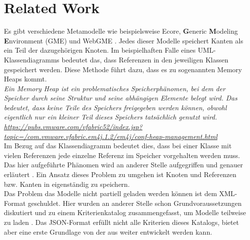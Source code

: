 \section{Related Work}
Es gibt verschiedene Metamodelle wie beispielsweise Ecore, \textbf{G}eneric \textbf{M}odeling \textbf{E}nvironment (GME) \cite{ledeczi2001generic} und WebGME \cite{maroti2014online}. Jedes dieser Modelle speichert Kanten als ein Teil der dazugehörigen Knoten. Im beispielhaften Falle eines UML-Klassendiagramms bedeutet das, dass Referenzen in den jeweiligen Klassen gespeichert werden. Diese Methode führt dazu, dass es zu sogenannten Memory Heaps kommt. \\
\textit{Ein Memory Heap ist ein problematisches Speicherphänomen, bei dem der Speicher durch seine Struktur und seine abhängigen Elemente belegt wird. Das bedeutet, dass keine Teile des Speichers freigegeben werden können, obwohl eigentlich nur ein kleiner Teil dieses Speichers tatsächlich genutzt wird. \url{https://pubs.vmware.com/vfabric52/index.jsp?topic=/com.vmware.vfabric.em4j.1.2/em4j/conf-heap-management.html}} \\
Im Bezug auf das Klassendiagramm bedeutet dies, dass bei einer Klasse mit vielen Referenzen jede einzelne Referenz im Speicher vorgehalten werden muss. Das hier aufgeführte Phänomen wird an anderer Stelle aufgegriffen und genauer erläutert \cite{scheidgen2013reference}. Ein Ansatz dieses Problem zu umgehen ist Knoten und Referenzen bzw. Kanten in eigenständig zu speichern. \\
Das Problem das Modelle nicht partiell geladen werden können ist dem XML-Format geschuldet. Hier wurden an anderer Stelle schon Grundvoraussetzungen diskutiert und zu einem Kriterienkatalog zusammengefasst, um Modelle teilweise zu laden \cite{kolovos2013research}. Das JSON-Format erfüllt nicht alle Kriterien dieses Katalogs, bietet aber eine erste Grundlage von der aus weiter entwickelt werden kann.